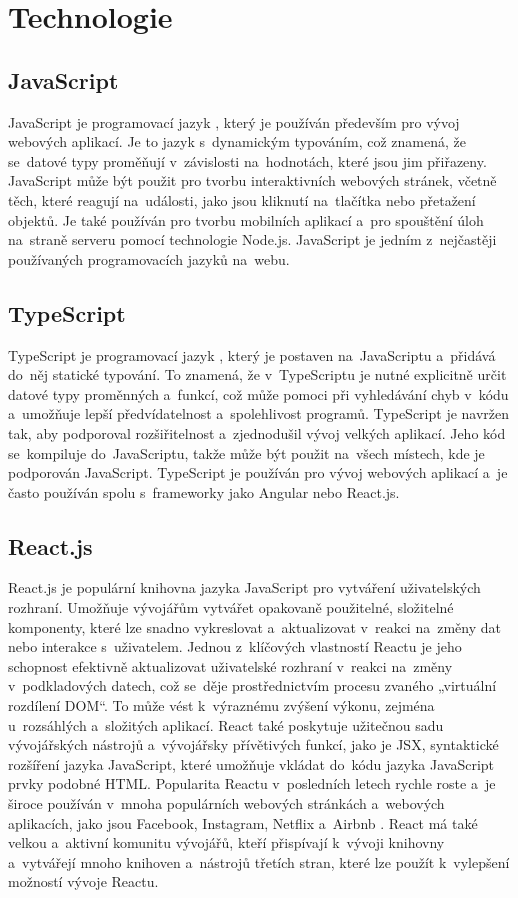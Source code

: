 \section{Technologie}

\subsection{JavaScript}
JavaScript je programovací jazyk \cite{javascript}, který je používán především pro vývoj webových aplikací. Je to jazyk s~dynamickým typováním, což znamená, že se~datové typy proměňují v~závislosti na~hodnotách, které jsou jim přiřazeny. JavaScript může být použit pro tvorbu interaktivních webových stránek, včetně těch, které reagují na~události, jako jsou kliknutí na~tlačítka nebo přetažení objektů. Je také používán pro tvorbu mobilních aplikací a~pro spouštění úloh na~straně serveru pomocí technologie Node.js. JavaScript je jedním z~nejčastěji používaných programovacích jazyků na~webu.

\subsection{TypeScript} TypeScript je programovací jazyk \cite{typescript}, který je postaven na~JavaScriptu a~přidává do~něj statické typování. To znamená, že v~TypeScriptu je nutné explicitně určit datové typy proměnných a~funkcí, což může pomoci při vyhledávání chyb v~kódu a~umožňuje lepší předvídatelnost a~spolehlivost programů. TypeScript je navržen tak, aby podporoval rozšiřitelnost a~zjednodušil vývoj velkých aplikací. Jeho kód se~kompiluje do~JavaScriptu, takže může být použit na~všech místech, kde je podporován JavaScript. TypeScript je používán pro vývoj webových aplikací a~je často používán spolu s~frameworky jako Angular nebo React.js.
\subsection{React.js}\label{reactjs} React.js je populární knihovna jazyka JavaScript pro vytváření uživatelských rozhraní. Umožňuje vývojářům vytvářet opakovaně použitelné, složitelné komponenty, které lze snadno vykreslovat a~aktualizovat v~reakci na~změny dat nebo interakce s~uživatelem. Jednou z~klíčových vlastností Reactu je jeho schopnost efektivně aktualizovat uživatelské rozhraní v~reakci na~změny v~podkladových datech, což se~děje prostřednictvím procesu zvaného „virtuální rozdílení DOM“. To může vést k~výraznému zvýšení výkonu, zejména u~rozsáhlých a~složitých aplikací. React také poskytuje užitečnou sadu vývojářských nástrojů a~vývojářsky přívětivých funkcí, jako je JSX, syntaktické rozšíření jazyka JavaScript, které umožňuje vkládat do~kódu jazyka JavaScript prvky podobné HTML. Popularita Reactu v~posledních letech rychle roste a~je široce používán v~mnoha populárních webových stránkách a~webových aplikacích, jako jsou Facebook, Instagram, Netflix a~Airbnb \cite{reactUsers}. React má také velkou a~aktivní komunitu vývojářů, kteří přispívají k~vývoji knihovny a~vytvářejí mnoho knihoven a~nástrojů třetích stran, které lze použít k~vylepšení možností vývoje Reactu.
